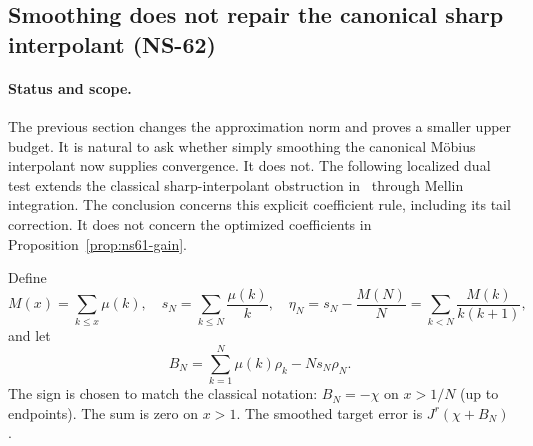 \documentclass[11pt]{article}
\theoremstyle{remark}
\begin{document}
\subsection{Smoothing does not repair the canonical sharp interpolant (NS-62)}
\label{sec:ns62-sharp-interpolant}

\paragraph{Status and scope.}
The previous section changes the approximation norm and proves a smaller
upper budget. It is natural to ask whether simply smoothing the canonical
M\"obius interpolant now supplies convergence. It does not. The following
localized dual test extends the classical sharp-interpolant obstruction
in~\cite[Section 4]{BaezDuarte2000Arithmetic} through Mellin integration.
The conclusion concerns this explicit coefficient rule, including its
tail correction. It does not concern the optimized coefficients in
Proposition~\ref{prop:ns61-gain}.

Define
\[
 M(x)=\sum_{k\leq x}\mu(k),\quad
 s_N=\sum_{k\leq N}\frac{\mu(k)}k,\quad
 \eta_N=s_N-\frac{M(N)}N
       =\sum_{k<N}\frac{M(k)}{k(k+1)},
\]
and let
\begin{equation}
 B_N=\sum_{k=1}^N\mu(k)\rho_k-Ns_N\rho_N.
 \label{eq:ns62-natural-interpolant}
\end{equation}
The sign is chosen to match the classical notation: $B_N=-\chi$
on $x>1/N$ (up to endpoints). The sum is zero on $x>1$.
The smoothed target error is $J^r(\chi+B_N)$.
\end{document}
